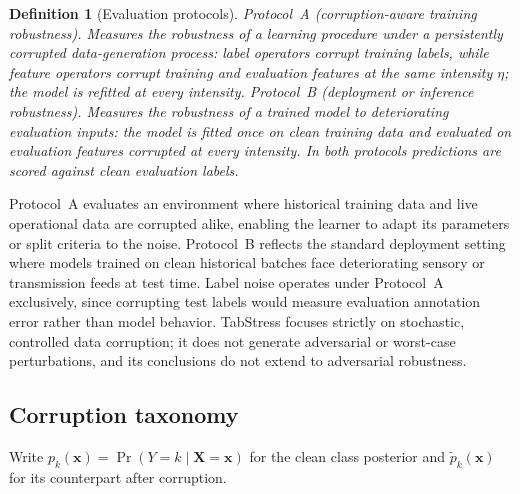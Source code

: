 \documentclass[pdflatex,sn-mathphys]{sn-jnl}
\theoremstyle{thmstyleone}
\theoremstyle{thmstyletwo}
\theoremstyle{thmstylethree}
\newtheorem{definition}{Definition}
\begin{document}
\begin{definition}[Evaluation protocols]\label{def:protocols}
\emph{Protocol~A (corruption-aware training robustness).} Measures the robustness of a learning procedure under a persistently corrupted data-generation process: label operators corrupt training labels, while feature operators corrupt training and evaluation features at the same intensity $\eta$; the model is refitted at every intensity. \emph{Protocol~B (deployment or inference robustness).} Measures the robustness of a trained model to deteriorating evaluation inputs: the model is fitted once on clean training data and evaluated on evaluation features corrupted at every intensity. In both protocols predictions are scored against clean evaluation labels.
\end{definition}

Protocol~A evaluates an environment where historical training data and live operational data are corrupted alike, enabling the learner to adapt its parameters or split criteria to the noise. Protocol~B reflects the standard deployment setting where models trained on clean historical batches face deteriorating sensory or transmission feeds at test time. Label noise operates under Protocol~A exclusively, since corrupting test labels would measure evaluation annotation error rather than model behavior. TabStress focuses strictly on stochastic, controlled data corruption; it does not generate adversarial or worst-case perturbations, and its conclusions do not extend to adversarial robustness.

\subsection{Corruption taxonomy}\label{sec:problem:taxonomy}

Write $p_k(\mathbf{x})=\Pr(Y=k\mid\mathbf{X}=\mathbf{x})$ for the clean class posterior and $\tilde p_k(\mathbf{x})$ for its counterpart after corruption.
\end{document}
